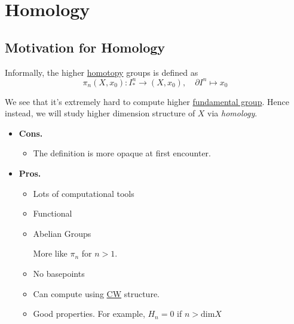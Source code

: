 \section{Homology}
\subsection{Motivation for Homology}
Informally, the higher \hyperref[def:homotopy]{homotopy} groups is defined as
\[
	\pi _{n} (X, x_0)\colon I^n_\ast \to (X, x_0),\quad \partial I^n \mapsto x_0
\]

\begin{figure}[H]
	\centering
	\label{fig:higher-homotopy-group-dim2}
\end{figure}
\begin{figure}[H]
	\centering
	\label{fig:higher-homotopy-group-dim2-2}
\end{figure}


We see that it's extremely hard to compute higher \hyperref[def:fundamental-group]{fundamental group}. Hence instead,
we will study higher dimension structure of \(X\) via \emph{homology}.

\begin{itemize}
	\item \textbf{Cons.}
	      \begin{itemize}
		      \item The definition is more opaque at first encounter.
	      \end{itemize}
	\item \textbf{Pros.}
	      \begin{itemize}
		      \item Lots of computational tools
		      \item Functional
		      \item Abelian Groups
		            \begin{remark}
			            More like \(\pi _n\) for \(n>1\).
		            \end{remark}
		      \item No basepoints
		      \item Can compute using \hyperref[def:CW-subcomplex]{CW} structure.
		      \item Good properties. For example, \(H_{n} = 0\) if \(n > \mathrm{dim} X\)
	      \end{itemize}
\end{itemize}

